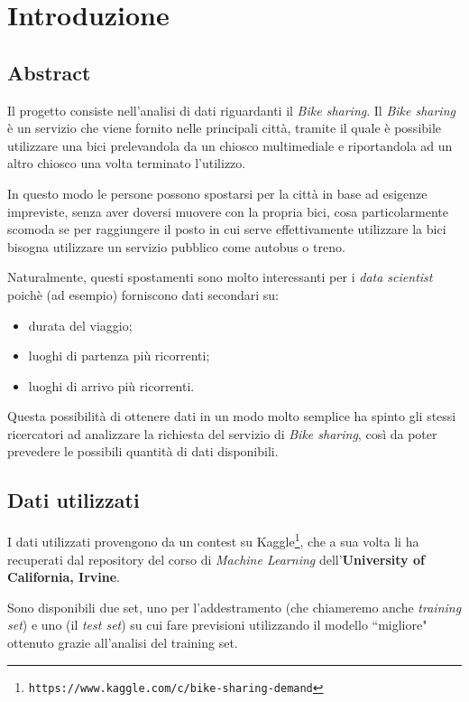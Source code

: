 \section{Introduzione}

\subsection{Abstract}
Il progetto consiste nell'analisi di dati riguardanti il \emph{Bike sharing}.
Il \emph{Bike sharing} è un servizio che viene fornito nelle principali città,
tramite il quale è possibile utilizzare una bici prelevandola da un chiosco
multimediale e riportandola ad un altro chiosco una volta terminato l'utilizzo.

In questo modo le persone possono spostarsi per la città in base ad esigenze
impreviste, senza aver doversi muovere con la propria bici, cosa
particolarmente scomoda se per raggiungere il posto in cui serve
effettivamente utilizzare la bici bisogna utilizzare un servizio pubblico come
autobus o treno.

Naturalmente, questi spostamenti sono molto interessanti per i \emph{data
scientist} poichè (ad esempio) forniscono dati secondari su:

\begin{itemize}
\item durata del viaggio;
\item luoghi di partenza più ricorrenti;
\item luoghi di arrivo più ricorrenti.
\end{itemize}

Questa possibilità di ottenere dati in un modo molto semplice ha spinto gli
stessi ricercatori ad analizzare la richiesta del servizio di \emph{Bike
sharing}, così da poter prevedere le possibili quantità di dati disponibili.

\subsection{Dati utilizzati}

I dati utilizzati provengono da un contest su
Kaggle\footnote{\texttt{https://www.kaggle.com/c/bike-sharing-demand}},
che a sua volta li ha recuperati dal repository del corso di
\emph{Machine Learning} dell'\textbf{University of California, Irvine}.

Sono disponibili due set, uno per l'addestramento (che chiameremo anche
\emph{training set}) e uno (il \emph{test set}) su cui fare previsioni
utilizzando il modello ``migliore" ottenuto grazie all'analisi del training
set.

